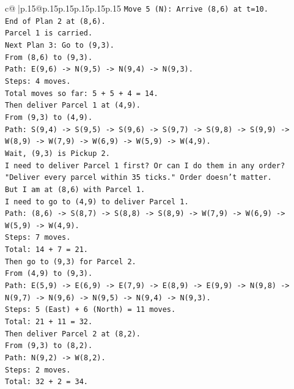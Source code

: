 \documentclass{article}
\begin{document}
{\begin{supertabular}{c@{$\;$}|p{.15\linewidth}@{}p{.15\linewidth}p{.15\linewidth}p{.15\linewidth}p{.15\linewidth}p{.15\linewidth}}
{{{\texttt{Move 5 (N): Arrive (8,6) at t=10.} \\
\texttt{End of Plan 2 at (8,6).} \\
\texttt{Parcel 1 is carried.} \\
\texttt{Next Plan 3: Go to (9,3).} \\
\texttt{From (8,6) to (9,3).} \\
\texttt{Path: E(9,6) {-}> N(9,5) {-}> N(9,4) {-}> N(9,3).} \\
\texttt{Steps: 4 moves.} \\
\texttt{Total moves so far: 5 + 5 + 4 = 14.} \\
\texttt{Then deliver Parcel 1 at (4,9).} \\
\texttt{From (9,3) to (4,9).} \\
\texttt{Path: S(9,4) {-}> S(9,5) {-}> S(9,6) {-}> S(9,7) {-}> S(9,8) {-}> S(9,9) {-}> W(8,9) {-}> W(7,9) {-}> W(6,9) {-}> W(5,9) {-}> W(4,9).} \\
\texttt{Wait, (9,3) is Pickup 2.} \\
\texttt{I need to deliver Parcel 1 first? Or can I do them in any order?} \\
\texttt{"Deliver every parcel within 35 ticks." Order doesn't matter.} \\
\texttt{But I am at (8,6) with Parcel 1.} \\
\texttt{I need to go to (4,9) to deliver Parcel 1.} \\
\texttt{Path: (8,6) {-}> S(8,7) {-}> S(8,8) {-}> S(8,9) {-}> W(7,9) {-}> W(6,9) {-}> W(5,9) {-}> W(4,9).} \\
\texttt{Steps: 7 moves.} \\
\texttt{Total: 14 + 7 = 21.} \\
\texttt{Then go to (9,3) for Parcel 2.} \\
\texttt{From (4,9) to (9,3).} \\
\texttt{Path: E(5,9) {-}> E(6,9) {-}> E(7,9) {-}> E(8,9) {-}> E(9,9) {-}> N(9,8) {-}> N(9,7) {-}> N(9,6) {-}> N(9,5) {-}> N(9,4) {-}> N(9,3).} \\
\texttt{Steps: 5 (East) + 6 (North) = 11 moves.} \\
\texttt{Total: 21 + 11 = 32.} \\
\texttt{Then deliver Parcel 2 at (8,2).} \\
\texttt{From (9,3) to (8,2).} \\
\texttt{Path: N(9,2) {-}> W(8,2).} \\
\texttt{Steps: 2 moves.} \\
\texttt{Total: 32 + 2 = 34.} \\
}}}
\end{supertabular}}
\end{document}
